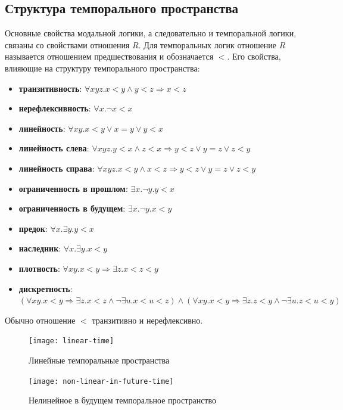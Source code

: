 		\subsection{Структура темпорального пространства}
		 Основные свойства модальной логики, а следовательно и темпоральной логики, связаны со свойствами отношения $ R $.
		 Для темпоральных логик отношение $ R $ называется отношением предшествования и обозначается $ < $.
		 Его свойства, влияющие на структуру темпорального пространства:
		 \begin{itemize}
		 	\item \textbf{транзитивность}: $ \forall xyz.x<y \land y<z \Rightarrow x < z  $
		 	\item \textbf{нерефлексивность}: $ \forall x.\neg x < x $
		 	\item \textbf{линейность}: $ \forall xy. x < y \lor x = y \lor y < x$
		 	\item \textbf{линейность слева}: $ \forall xyz. y<x \land z<x \Rightarrow y<z \lor y=z \lor z<y $
		 	\item \textbf{линейность справа}: $ \forall xyz. x<y \land x<z \Rightarrow y<z \lor y=z \lor z<y $
		 	\item \textbf{ограниченность в прошлом}: $ \exists x. \neg y. y<x $
		 	\item \textbf{ограниченность в будущем}: $ \exists x. \neg y. x<y $
		 	\item \textbf{предок}: $ \forall x.\exists y.y<x $
		 	\item \textbf{наследник}: $ \forall x.\exists y.x<y $
		 	\item \textbf{плотность}: $ \forall xy.x<y\Rightarrow \exists z. x<z<y $
		 	\item \textbf{дискретность}: $ ( \forall xy.x<y\Rightarrow \exists z.x<z \land \neg \exists u.x<u<z)\land (\forall xy.x<y\Rightarrow \exists z.z<y \land \neg \exists u.z<u<y) $ 
		 \end{itemize}
	     Обычно отношение $ < $ транзитивно и нерефлексивно.
	     
	     \begin{figure}[h]
	     	\centering
	     	\texttt{[image: linear-time]}
	     	\caption{Линейные темпоральные пространства}
	     	\label{fig:linear-time}
	     \end{figure}
		 
		\begin{figure}[h]
			\centering
			\texttt{[image: non-linear-in-future-time]}
			\caption{Нелинейное в будущем темпоральное пространство}
			\label{fig:non-linear-in-future-time}
		\end{figure}
